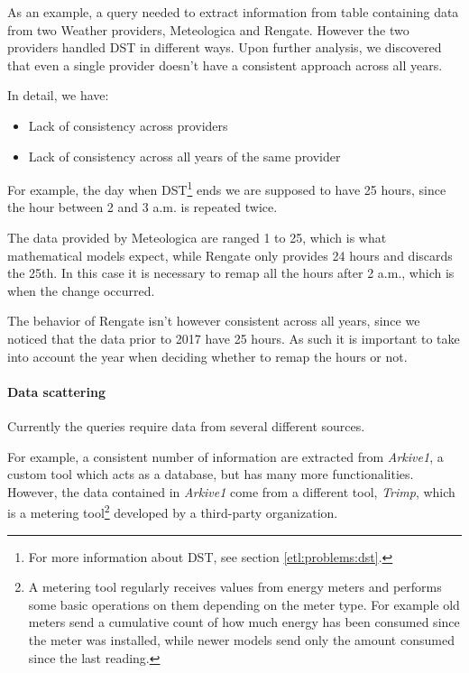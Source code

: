         As an example, a query needed to extract information from table containing data from two Weather providers, Meteologica and Rengate.
        However the two providers handled DST in different ways.
        Upon further analysis, we discovered that even a single provider doesn't have a consistent approach across all years.
        
        In detail, we have:
            \begin{itemize}
                \item Lack of consistency across providers
                \item Lack of consistency across all years of the same provider
            \end{itemize}

        For example, the day when DST\footnote{For more information about DST, see section \ref{etl:problems:dst}.} ends we are supposed to have 25 hours, since the hour between 2 and 3 a.m. is repeated twice.
        
        The data provided by Meteologica are ranged 1 to 25, which is what mathematical models expect, while Rengate only provides 24 hours and discards the 25th.
        In this case it is necessary to remap all the hours after 2 a.m., which is when the change occurred.
        
        The behavior of Rengate isn't however consistent across all years, since we noticed that the data prior to 2017 have 25 hours.
        As such it is important to take into account the year when deciding whether to remap the hours or not.
        
    \paragraph{Data scattering}
        Currently the queries require data from several different sources.
        
        For example, a consistent number of information are extracted from \textit{Arkive1}, a custom tool which acts as a database, but has many more functionalities.
        However, the data contained in \textit{Arkive1} come from a different  tool, \textit{Trimp}, which is a metering tool\footnote{A metering tool regularly receives values from energy meters and performs some basic operations on them depending on the meter type.
        For example old meters send a cumulative count of how much energy has been consumed since the meter was installed, while newer models send only the amount consumed since the last reading.} developed by a third-party organization.\reword
        
